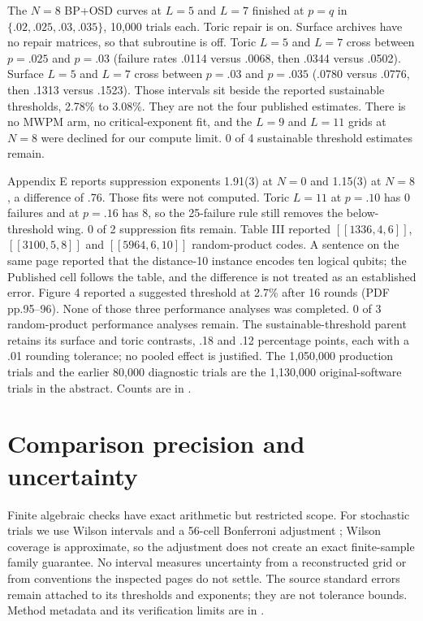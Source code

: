 The $N=8$ BP+OSD curves at $L=5$ and $L=7$ finished at $p=q$ in $\{.02,.025,.03,.035\}$, 10,000 trials each. Toric repair is on. Surface archives have no repair matrices, so that subroutine is off. Toric $L=5$ and $L=7$ cross between $p=.025$ and $p=.03$ (failure rates .0114 versus .0068, then .0344 versus .0502). Surface $L=5$ and $L=7$ cross between $p=.03$ and $p=.035$ (.0780 versus .0776, then .1313 versus .1523). Those intervals sit beside the reported sustainable thresholds, 2.78\% to 3.08\%. They are not the four published estimates. There is no MWPM arm, no critical-exponent fit, and the $L=9$ and $L=11$ grids at $N=8$ were declined for our compute limit. 0 of 4 sustainable threshold estimates remain.

Appendix E reports suppression exponents 1.91(3) at $N=0$ and 1.15(3) at $N=8$, a difference of .76. Those fits were not computed. Toric $L=11$ at $p=.10$ has 0 failures and at $p=.16$ has 8, so the 25-failure rule still removes the below-threshold wing. 0 of 2 suppression fits remain. Table III reported $[[1336,4,6]]$, $[[3100,5,8]]$ and $[[5964,6,10]]$ random-product codes. A sentence on the same page reported that the distance-10 instance encodes ten logical qubits; the Published cell follows the table, and the difference is not treated as an established error. Figure 4 reported a suggested threshold at 2.7\% after 16 rounds (PDF pp.95--96). None of those three performance analyses was completed. 0 of 3 random-product performance analyses remain. The sustainable-threshold parent retains its surface and toric contrasts, .18 and .12 percentage points, each with a .01 rounding tolerance; no pooled effect is justified. The 1,050,000 production trials and the earlier 80,000 diagnostic trials are the 1,130,000 original-software trials in the abstract. Counts are in \href{https://github.com/alectionary/vibe-math/blob/master/formalization/quintavalle-hgp/results/production_grid.json}{}.

\section{Comparison precision and uncertainty}
Finite algebraic checks have exact arithmetic but restricted scope. For stochastic trials we use Wilson intervals \citep{wilson1927} and a 56-cell Bonferroni adjustment \citep{nist}; Wilson coverage is approximate, so the adjustment does not create an exact finite-sample family guarantee. No interval measures uncertainty from a reconstructed grid or from conventions the inspected pages do not settle. The source standard errors remain attached to its thresholds and exponents; they are not tolerance bounds. Method metadata and its verification limits are in \href{https://github.com/alectionary/vibe-math/blob/master/formalization/quintavalle-hgp/sources/method-citations.json}{}.

